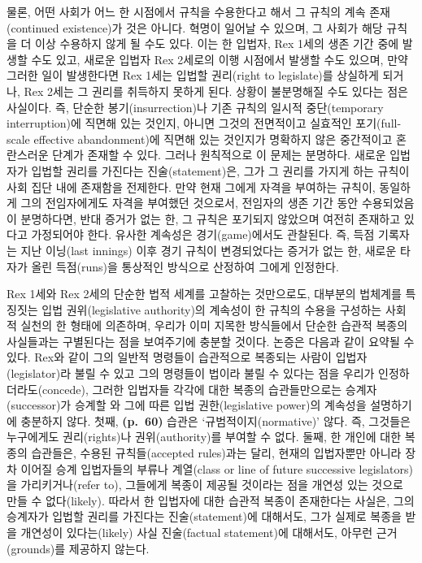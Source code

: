 물론, 어떤 사회가 어느 한 시점에서 규칙을 수용한다고 해서 그 규칙의 계속
존재(continued existence)가  것은 아니다.
혁명이 일어날 수 있으며, 그 사회가 해당 규칙을 더 이상 수용하지 않게 될
수도 있다. 이는 한 입법자, Rex 1세의 생존 기간 중에 발생할 수도 있고,
새로운 입법자 Rex 2세로의 이행 시점에서 발생할 수도 있으며, 만약 그러한
일이 발생한다면 Rex 1세는 입법할 권리(right to legislate)를 상실하게
되거나, Rex 2세는 그 권리를 취득하지 못하게 된다. 상황이 불분명해질 수도
있다는 점은 사실이다. 즉, 단순한 봉기(insurrection)나 기존 규칙의 일시적
중단(temporary interruption)에 직면해 있는 것인지, 아니면 그것의
전면적이고 실효적인 포기(full-scale effective abandonment)에 직면해 있는
것인지가 명확하지 않은 중간적이고 혼란스러운 단계가 존재할 수 있다.
그러나 원칙적으로 이 문제는 분명하다. 새로운 입법자가 입법할 권리를
가진다는 진술(statement)은, 그가 그 권리를 가지게 하는 규칙이 사회 집단
내에 존재함을 전제한다. 만약 현재 그에게 자격을 부여하는 규칙이,
동일하게 그의 전임자에게도 자격을 부여했던 것으로서, 전임자의 생존 기간
동안 수용되었음이 분명하다면, 반대 증거가 없는 한, 그 규칙은 포기되지
않았으며 여전히 존재하고 있다고 가정되어야 한다. 유사한 계속성은
경기(game)에서도 관찰된다. 즉, 득점 기록자는 지난 이닝(last innings)
이후 경기 규칙이 변경되었다는 증거가 없는 한, 새로운 타자가 올린
득점(runs)을 통상적인 방식으로 산정하여 그에게 인정한다.

Rex 1세와 Rex 2세의 단순한 법적 세계를 고찰하는 것만으로도, 대부분의
법체계를 특징짓는 입법 권위(legislative authority)의 계속성이 한 규칙의
수용을 구성하는 사회적 실천의 한 형태에 의존하며, 우리가 이미 지목한
방식들에서 단순한 습관적 복종의 사실들과는 구별된다는 점을 보여주기에
충분할 것이다. 논증은 다음과 같이 요약될 수 있다. Rex와 같이 그의 일반적
명령들이 습관적으로 복종되는 사람이 입법자(legislator)라 불릴 수 있고
그의 명령들이 법이라 불릴 수 있다는 점을 우리가 인정하더라도(concede),
그러한 입법자들 각각에 대한 복종의 습관들만으로는 승계자(successor)가
승계할 와 그에 따른 입법 권한(legislative power)의
계속성을 설명하기에 충분하지 않다. 첫째, \textbf{(p.~60)} 습관은
‘규범적이지(normative)’ 않다. 즉, 그것들은 누구에게도 권리(rights)나
권위(authority)를 부여할 수 없다. 둘째, 한 개인에 대한 복종의 습관들은,
수용된 규칙들(accepted rules)과는 달리, 현재의 입법자뿐만 아니라 장차
이어질 승계 입법자들의 부류나 계열(class or line of future successive
legislators)을 가리키거나(refer to), 그들에게 복종이 제공될 것이라는
점을 개연성 있는 것으로 만들 수 없다(likely). 따라서 한 입법자에 대한
습관적 복종이 존재한다는 사실은, 그의 승계자가 입법할 권리를 가진다는
진술(statement)에 대해서도, 그가 실제로 복종을 받을 개연성이
있다는(likely) 사실 진술(factual statement)에 대해서도, 아무런
근거(grounds)를 제공하지 않는다.


